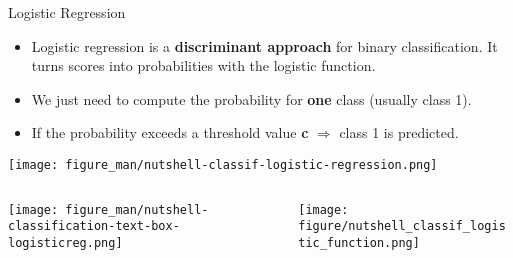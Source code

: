\documentclass[11pt,compress,t,notes=noshow, xcolor=table]{beamer}
\begin{document}
\begin{vbframe}{Logistic Regression}

\begin{itemize}
\item \small Logistic regression is a \textbf{discriminant approach} for binary classification. It turns scores into probabilities with the logistic function.
\item \small We just need to compute the probability for \textbf{one} class (usually class 1).
\item \small If the probability exceeds a threshold value \textbf{c} $\Rightarrow$ class 1 is predicted.
\end{itemize}

\begin{center}
  \texttt{[image: figure\_man/nutshell-classif-logistic-regression.png]}
\end{center}
\begin{columns}
\begin{column}{0.35\textwidth} 
\begin{center}
\texttt{[image: figure\_man/nutshell-classification-text-box-logisticreg.png]}
\end{center}
\end{column}
\begin{column}{0.6\textwidth} 
\begin{center}

  \texttt{[image: figure/nutshell\_classif\_logistic\_function.png]}
\end{center}
\end{column}
\end{columns}



\end{vbframe}



\end{document}
